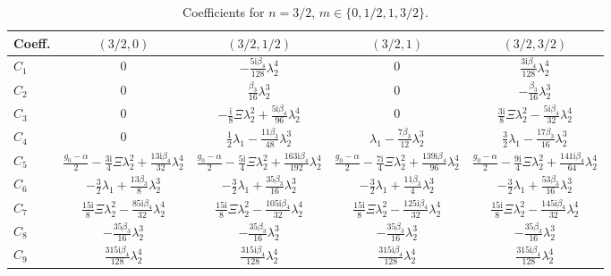 \documentclass[11pt]{article}
\newcommand{\ii}{\mathrm{i}}
\begin{document}
\begin{table}[htbp]
\centering\small
\caption{Coefficients for $n=3/2$, $m\in\{0,1/2,1,3/2\}$.}
\label{tab:n32-3-32}
\begin{tabular}{lcccc}
\toprule
Coeff. & $(3/2,0)$ & $(3/2,1/2)$ & $(3/2,1)$ & $(3/2,3/2)$ \\
\midrule
$C_1$ & $0$ & $-\tfrac{5\ii\beta_4}{128}\lambda_2^4$ & $0$ & $\tfrac{3\ii\beta_4}{128}\lambda_2^4$ \\
$C_2$ & $0$ & $\tfrac{\beta_3}{16}\lambda_2^3$ & $0$ & $-\tfrac{\beta_3}{16}\lambda_2^3$ \\
$C_3$ & $0$ & $-\tfrac{\ii}{8}\Xi\lambda_2^2+\tfrac{5\ii\beta_4}{96}\lambda_2^4$ & $0$ & $\tfrac{3\ii}{8}\Xi\lambda_2^2-\tfrac{5\ii\beta_4}{32}\lambda_2^4$ \\
$C_4$ & $0$ & $\tfrac12\lambda_1-\tfrac{11\beta_3}{48}\lambda_2^3$ & $\lambda_1-\tfrac{7\beta_3}{12}\lambda_2^3$ & $\tfrac32\lambda_1-\tfrac{17\beta_3}{16}\lambda_2^3$ \\
$C_5$ & $\tfrac{g_0-\alpha}{2}-\tfrac{3\ii}{4}\Xi\lambda_2^2+\tfrac{13\ii\beta_4}{32}\lambda_2^4$ & $\tfrac{g_0-\alpha}{2}-\tfrac{5\ii}{4}\Xi\lambda_2^2+\tfrac{163\ii\beta_4}{192}\lambda_2^4$ & $\tfrac{g_0-\alpha}{2}-\tfrac{7\ii}{4}\Xi\lambda_2^2+\tfrac{139\ii\beta_4}{96}\lambda_2^4$ & $\tfrac{g_0-\alpha}{2}-\tfrac{9\ii}{4}\Xi\lambda_2^2+\tfrac{141\ii\beta_4}{64}\lambda_2^4$ \\
$C_6$ & $-\tfrac32\lambda_1+\tfrac{13\beta_3}{8}\lambda_2^3$ & $-\tfrac32\lambda_1+\tfrac{35\beta_3}{16}\lambda_2^3$ & $-\tfrac32\lambda_1+\tfrac{11\beta_3}{4}\lambda_2^3$ & $-\tfrac32\lambda_1+\tfrac{53\beta_3}{16}\lambda_2^3$ \\
$C_7$ & $\tfrac{15\ii}{8}\Xi\lambda_2^2-\tfrac{85\ii\beta_4}{32}\lambda_2^4$ & $\tfrac{15\ii}{8}\Xi\lambda_2^2-\tfrac{105\ii\beta_4}{32}\lambda_2^4$ & $\tfrac{15\ii}{8}\Xi\lambda_2^2-\tfrac{125\ii\beta_4}{32}\lambda_2^4$ & $\tfrac{15\ii}{8}\Xi\lambda_2^2-\tfrac{145\ii\beta_4}{32}\lambda_2^4$ \\
$C_8$ & $-\tfrac{35\beta_3}{16}\lambda_2^3$ & $-\tfrac{35\beta_3}{16}\lambda_2^3$ & $-\tfrac{35\beta_3}{16}\lambda_2^3$ & $-\tfrac{35\beta_3}{16}\lambda_2^3$ \\
$C_9$ & $\tfrac{315\ii\beta_4}{128}\lambda_2^4$ & $\tfrac{315\ii\beta_4}{128}\lambda_2^4$ & $\tfrac{315\ii\beta_4}{128}\lambda_2^4$ & $\tfrac{315\ii\beta_4}{128}\lambda_2^4$ \\
\bottomrule
\end{tabular}
\end{table}
\end{document}
